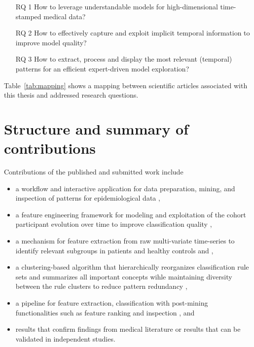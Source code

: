 \documentclass[
]{book}
\providecommand{\tightlist}{%
  \setlength{\itemsep}{0pt}\setlength{\parskip}{0pt}}
\begin{document}
\begin{bfseries}
    \begin{itemize}
        \item[RQ 1] How to leverage understandable models for high-dimensional time-stamped medical data?
        \item[RQ 2] How to effectively capture and exploit implicit temporal information to improve model quality?
        \item[RQ 3] How to extract, process and display the most relevant (temporal) patterns for an efficient expert-driven model exploration?
    \end{itemize}
\end{bfseries}

Table~\ref{tab:mapping} shows a mapping between scientific articles associated with this thesis and addressed research questions.

\hypertarget{structure-and-summary-of-contributions}{%
\section{Structure and summary of contributions}\label{structure-and-summary-of-contributions}}

Contributions of the published and submitted work include

\begin{itemize}
\tightlist
\item
  a workflow and interactive application for data preparation, mining, and inspection of patterns for epidemiological data \autocite{Niemann:ESWA2014,Niemann:IMM2014},
\item
  a feature engineering framework for modeling and exploitation of the cohort participant evolution over time to improve classification quality \autocite{Niemann:CBMS2015,Niemann:SciRep2020},
\item
  a mechanism for feature extraction from raw multi-variate time-series to identify relevant subgroups in patients and healthy controls and \autocite{Niemann:CBMS2016,Niemann:PONE2016},
\item
  a clustering-based algorithm that hierarchically reorganizes classification rule sets and summarizes all important concepts wihle maintaining diversity between the rule clusters to reduce pattern redundancy \autocite{Niemann:CBMS2017},
\item
  a pipeline for feature extraction, classification with post-mining functionalities such as feature ranking and inspection \autocite{Niemann:CBMS2018}, and
\item
  results that confirm findings from medical literature or results that can be validated in independent studies.
\end{itemize}
\end{document}
